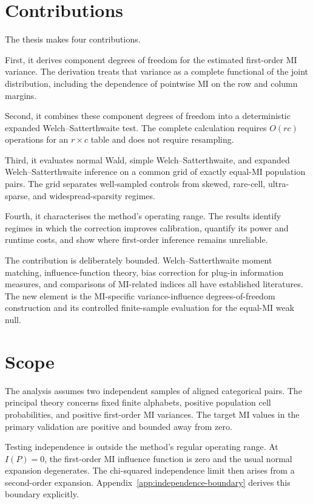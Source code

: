 \section{Contributions}

The thesis makes four contributions.

First, it derives component degrees of freedom for the estimated first-order
MI variance. The derivation treats that variance as a complete functional of
the joint distribution, including the dependence of pointwise MI on the row
and column margins.

Second, it combines these component degrees of freedom into a deterministic
expanded Welch--Satterthwaite test. The complete calculation requires
\(O(rc)\) operations for an \(r\times c\) table and does not require
resampling.

Third, it evaluates normal Wald, simple Welch--Satterthwaite, and expanded
Welch--Satterthwaite inference on a common grid of exactly equal-MI population
pairs. The grid separates well-sampled controls from skewed, rare-cell,
ultra-sparse, and widespread-sparsity regimes.

Fourth, it characterises the method's operating range. The results identify
regimes in which the correction improves calibration, quantify its power and
runtime costs, and show where first-order inference remains unreliable.

The contribution is deliberately bounded. Welch--Satterthwaite moment
matching, influence-function theory, bias correction for plug-in information
measures, and comparisons of MI-related indices all have established
literatures. The new element is the MI-specific variance-influence
degrees-of-freedom construction and its controlled finite-sample evaluation
for the equal-MI weak null.

\section{Scope}

The analysis assumes two independent samples of aligned categorical pairs.
The principal theory concerns fixed finite alphabets, positive population cell
probabilities, and positive first-order MI variances. The target MI values in
the primary validation are positive and bounded away from zero.

Testing independence is outside the method's regular operating range. At
\(I(P)=0\), the first-order MI influence function is zero and the usual
normal expansion degenerates. The chi-squared independence limit then arises
from a second-order expansion. Appendix~\ref{app:independence-boundary} derives this
boundary explicitly.

